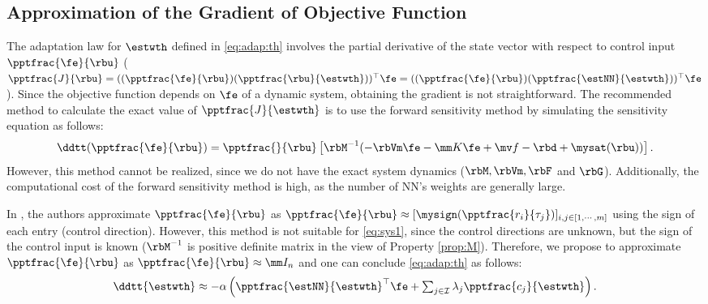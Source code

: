 \documentclass[final,5p,times,twocolumn,authoryear]{elsarticle}
\begin{document}
\subsection{Approximation of the Gradient of Objective Function}

The adaptation law for $\estwth$ defined in \eqref{eq:adap:th} involves the partial derivative of the state vector with respect to control input $\pptfrac{\fe}{\rbu}$ (\ie 
$
    \pptfrac{J}{\rbu}
    =
    ((\pptfrac{\fe}{\rbu})(\pptfrac{\rbu}{\estwth}))^\top \fe
    =
    ((\pptfrac{\fe}{\rbu})(\pptfrac{\estNN}{\estwth}))^\top \fe
$). 
Since the objective function depends on $\fe$ of a dynamic system, obtaining the gradient is not straightforward. 
The recommended method to calculate the exact value of $\pptfrac{J}{\estwth}$ is to use the forward sensitivity method \cite{Sengupta:2014aa} by simulating the sensitivity equation as follows: 
\begin{equation}
    \ddtt (
        \pptfrac{\fe}{\rbu}
    )
    =
    \pptfrac{}{
        \rbu
    }
    \left[
        \rbM^{-1}(
            -\rbVm \fe
            -\mm K \fe
            + \mv f
            -\rbd + \mysat(\rbu)
        )
    \right]
    .
\end{equation}
However, this method cannot be realized, since we do not have the exact system dynamics (\ie $\rbM,\rbVm, \rbF$ and $ \rbG$).
Additionally, the computational cost of the forward sensitivity method is high, as the number of NN's weights are generally large.

In \cite{Douratsos:2007aa,Saerens:1991aa}, the authors approximate $\pptfrac{\fe}{\rbu}$ as $
    \pptfrac{\fe}{\rbu}
    \approx
    [
        \mysign(\pptfrac{r_i}{\tau_j})
    ]_{i,j\in[1,\cdots,m]}
$ using the sign of each entry (\ie control direction).
However, this method is not suitable for \eqref{eq:sys1}, since the control directions are unknown, but the sign of the control input is known (\ie $\rbM^{-1}$ is positive definite matrix in the view of Property \ref{prop:M}).
Therefore, we propose to approximate $\pptfrac{\fe}{\rbu}$ as $\pptfrac{\fe}{\rbu}\approx \mm I_n$ and one can conclude \eqref{eq:adap:th} as follows:
\begin{equation}
    \ddtt{\estwth}
    \approx
    -\alpha 
    \left(
        \pptfrac{\estNN}
        {\estwth}^\top
        \fe
        +
        \textstyle\sum_{j\in\mathcal{I}}
        \lambda_j 
        \pptfrac{c_j}{\estwth}
    \right)
    .
    \label{eq:adap:th:approx}
\end{equation}
\end{document}
